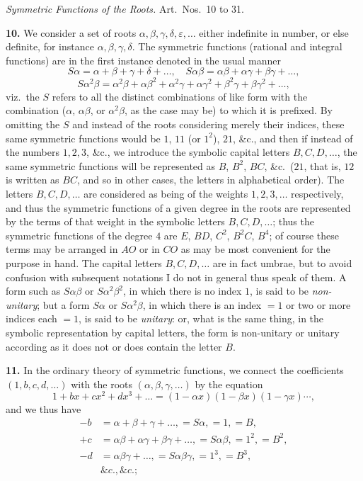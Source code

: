 \documentclass[11pt]{article}
\begin{document}
\begin{center}
\textit{Symmetric Functions of the Roots.} \quad Art.\ Nos.\ 10 to 31.
\end{center}

\textbf{10.} We consider a set of roots $\alpha, \beta, \gamma, \delta, \varepsilon, \ldots$ either indefinite in number, or else definite, for instance $\alpha, \beta, \gamma, \delta$. The symmetric functions (rational and integral functions) are in the first instance denoted in the usual manner
\[
S\alpha = \alpha + \beta + \gamma + \delta + \ldots,\quad S\alpha\beta = \alpha\beta + \alpha\gamma + \beta\gamma + \ldots,
\]
\[
S\alpha^2\beta = \alpha^2\beta + \alpha\beta^2 + \alpha^2\gamma + \alpha\gamma^2 + \beta^2\gamma + \beta\gamma^2 + \ldots,
\]
viz.\ the $S$ refers to all the distinct combinations of like form with the combination ($\alpha$, $\alpha\beta$, or $\alpha^2\beta$, as the case may be) to which it is prefixed. By omitting the $S$ and instead of the roots considering merely their indices, these same symmetric functions would be $1$, $11$ (or $1^2$), $21$, \&c., and then if instead of the numbers $1, 2, 3$, \&c., we introduce the symbolic capital letters $B, C, D, \ldots$, the same symmetric functions will be represented as $B$, $B^2$, $BC$, \&c.\ ($21$, that is, $12$ is written as $BC$, and so in other cases, the letters in alphabetical order). The letters $B, C, D, \ldots$ are considered as being of the weights $1, 2, 3, \ldots$ respectively, and thus the symmetric functions of a given degree in the roots are represented by the terms of that weight in the symbolic letters $B, C, D, \ldots$; thus the symmetric functions of the degree $4$ are $E$, $BD$, $C^2$, $B^2 C$, $B^4$; of course these terms may be arranged in $AO$ or in $CO$ as may be most convenient for the purpose in hand. The capital letters $B, C, D, \ldots$ are in fact umbrae, but to avoid confusion with subsequent notations I do not in general thus speak of them. A form such as $S\alpha\beta$ or $S\alpha^2\beta^2$, in which there is no index $1$, is said to be \textit{non-unitary}; but a form $S\alpha$ or $S\alpha^2\beta$, in which there is an index $= 1$ or two or more indices each $= 1$, is said to be \textit{unitary}: or, what is the same thing, in the symbolic representation by capital letters, the form is non-unitary or unitary according as it does not or does contain the letter $B$.

\textbf{11.} In the ordinary theory of symmetric functions, we connect the coefficients $(1, b, c, d, \ldots)$ with the roots $(\alpha, \beta, \gamma, \ldots)$ by the equation
\[
1 + bx + cx^2 + dx^3 + \ldots = (1 - \alpha x)(1 - \beta x)(1 - \gamma x)\cdots,
\]
and we thus have
\begin{align*}
-b &= \alpha + \beta + \gamma + \ldots, = S\alpha, = 1, = B,\\
+c &= \alpha\beta + \alpha\gamma + \beta\gamma + \ldots, = S\alpha\beta, = 1^2, = B^2,\\
-d &= \alpha\beta\gamma + \ldots, = S\alpha\beta\gamma, = 1^3, = B^3,\\
&\&c., \&c.;
\end{align*}
\end{document}
